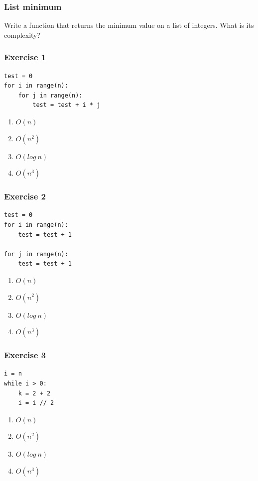 \documentclass[11pt]{beamer}
\begin{document}
\begin{frame}\frametitle{List minimum}
\begin{block}{}
Write a function that returns the minimum value on a list of integers. What is its complexity?
\end{block}
\end{frame}



\begin{frame}[fragile]\frametitle{Exercise 1}
\begin{lstlisting}
test = 0
for i in range(n):
	for j in range(n):
		test = test + i * j
\end{lstlisting}
\begin{enumerate}
\item $O(n)$
\item $O(n^2)$
\item $O(log\ n)$
\item $O(n^3)$
\end{enumerate}
\end{frame}

\begin{frame}[fragile]\frametitle{Exercise 2}
\begin{lstlisting}
test = 0
for i in range(n):
	test = test + 1
	
for j in range(n):
	test = test + 1
\end{lstlisting}
\begin{enumerate}
\item $O(n)$
\item $O(n^2)$
\item $O(log\ n)$
\item $O(n^3)$
\end{enumerate}
\end{frame}

\begin{frame}[fragile]\frametitle{Exercise 3}
\begin{lstlisting}
i = n
while i > 0:
	k = 2 + 2
	i = i // 2
\end{lstlisting}
\begin{enumerate}
\item $O(n)$
\item $O(n^2)$
\item $O(log\ n)$
\item $O(n^3)$
\end{enumerate}
\end{frame}
\end{document}
